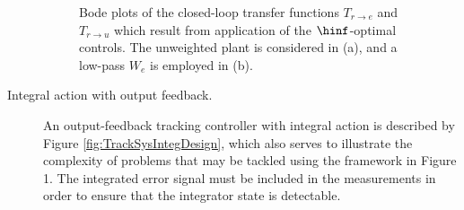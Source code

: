 \begin{description}
\begin{figure}

\caption{Bode plots of the closed-loop transfer functions $T_{r\rightarrow e}$ and $T_{r\rightarrow u}$ which result from application of the $\hinf$-optimal controls.\label{fig:sigmah2} The unweighted plant is considered in (a), and a low-pass $W_e$ is employed in (b).}
\end{figure}
\item[Integral action with output feedback.]
An output-feedback tracking controller with integral action is described by Figure \ref{fig:TrackSysIntegDesign}, which also serves to
illustrate the complexity of problems that may be tackled  using the framework in Figure 1. The integrated error signal must be included in the measurements in order to ensure that the integrator state is detectable. 


\end{description}
